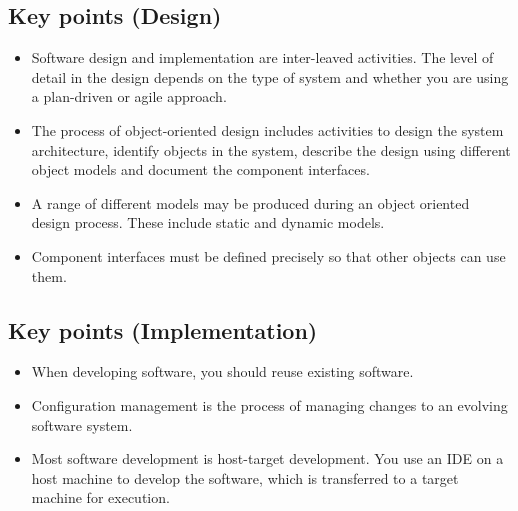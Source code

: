 \documentclass[../ESOF_notes.tex]{subfiles}
\begin{document}
\subsection{Key points (Design)}
\begin{itemize}
    \item Software design and implementation are inter-leaved activities. The level of detail in the design depends on the type of system and whether you are using a plan-driven or agile approach.
    \item The process of object-oriented design includes activities to design the system architecture, identify objects in the system, describe the design using different object models and document the component interfaces.
    \item A range of different models may be produced during an object oriented design process. These include static and dynamic models.
    \item Component interfaces must be defined precisely so that other objects can use them.
\end{itemize}

\subsection{Key points (Implementation)}
\begin{itemize}
    \item When developing software, you should reuse existing software.
    \item Configuration management is the process of managing changes to an evolving software system.
    \item Most software development is host-target development. You use an IDE on a host machine to develop the software, which is transferred to a target machine for execution.
\end{itemize}
\end{document}
